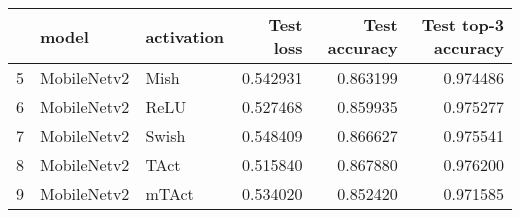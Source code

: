 \begin{tabular}{lllrrr}
\toprule
{} &        model & activation &  Test loss &  Test accuracy &  Test top-3 accuracy \\
\midrule
5 &  MobileNetv2 &       Mish &   0.542931 &       0.863199 &             0.974486 \\
6 &  MobileNetv2 &       ReLU &   0.527468 &       0.859935 &             0.975277 \\
7 &  MobileNetv2 &      Swish &   0.548409 &       0.866627 &             0.975541 \\
8 &  MobileNetv2 &       TAct &   0.515840 &       0.867880 &             0.976200 \\
9 &  MobileNetv2 &      mTAct &   0.534020 &       0.852420 &             0.971585 \\
\bottomrule
\end{tabular}
